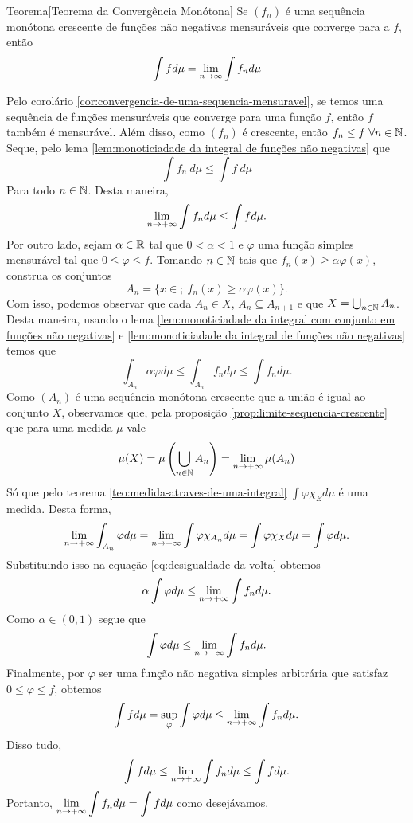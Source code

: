 \begin{env}{Teorema}[Teorema da Convergência Monótona]
	\label{teo:Convergencia Monótona}
	Se $(f_n)$ é uma sequência monótona crescente de funções não negativas mensuráveis que converge para a $f$, então
	$$
	\int f d\mu = \displaystyle \lim_{n \to \infty} \int f_n d\mu
	$$
\end{env}
\begin{prova}
	Pelo corolário \ref{cor:convergencia-de-uma-sequencia-mensuravel}, se temos uma sequência de funções mensuráveis que converge para uma função $f$, então $f$ também é mensurável.
	Além disso,
	como $(f_n)$ é crescente, então $f_n \leq f\ \forall n \in \operatorname{\mathbb{N}}$.
	Seque, pelo lema \ref{lem:monoticiadade da integral de funções não negativas} que 
	$$
	\int f_n\ d\mu \leq \int f\ d\mu
	$$
	Para todo $n \in \operatorname{\mathbb{N}}$.
	Desta maneira, 
	$$
	\displaystyle \lim_{n \to +\infty}\int f_n d\mu \leq \int f d\mu.
	$$
	Por outro lado, sejam $\alpha \in \mathbb{R}$ tal que $0 < \alpha <1$ e 
	$\varphi$ uma função simples mensurável tal que $0 \leq \varphi \leq f$.
	Tomando $n \in \operatorname{\mathbb{N}}$ tais que $f_n(x) \geq \alpha \varphi(x)$, construa
	os conjuntos 
	$$
	A_n =\{x \in ;\ f_n(x) \geq \alpha \varphi(x)\}.
	$$
	Com isso, podemos observar que cada $A_n \in X$, $A_{n} \subseteq A_{n+1}$
	e que $X = \bigcup_{n \in \operatorname{\mathbb{N}}}A_n$.
	Desta maneira, usando o lema \ref{lem:monoticiadade da integral com conjunto em funções não negativas} e \ref{lem:monoticiadade da integral de funções não negativas} temos que 
	\begin{equation}
		\label{eq:desigualdade da volta}
		\int_{A_n} \alpha\varphi d\mu
		\leq
		\int_{A_n} f_n d\mu
		\leq
		\int f_n d\mu.		
	\end{equation}
	Como $(A_n)$ é uma sequência monótona crescente que a união é igual ao conjunto $X$, observamos que, pela proposição \ref{prop:limite-sequencia-crescente} que para uma medida $\mu$ vale
	$$
	\mu(X) = \mu\left(\bigcup_{n \in \operatorname{\mathbb{N}}}A_n\right) = \lim_{n \to +\infty} \mu(A_n)
	$$
	Só que pelo teorema \ref{teo:medida-atraves-de-uma-integral} $\int \varphi \chi_E d\mu$ é uma medida.
	Desta forma, 
	$$
	\displaystyle \lim_{n \to +\infty} \int_{A_n} \varphi d\mu 
	= \displaystyle \lim_{n \to +\infty} \int \varphi \chi_{A_n} d\mu
	= \int \varphi \chi_X d\mu
	= \int \varphi d\mu.
	$$
	Substituindo isso na equação \ref{eq:desigualdade da volta} obtemos
	$$
	\alpha \int \varphi d\mu \leq \displaystyle \lim_{n \to +\infty} \int f_n d\mu.
	$$
	Como $\alpha \in (0,1)$ segue que
	$$
	\int \varphi d\mu \leq \displaystyle \lim_{n \to +\infty} \int f_n d\mu.
	$$
	Finalmente, por $\varphi$ ser uma função não negativa simples arbitrária que satisfaz $0\leq \varphi \leq f$, obtemos
	$$
	\int f d\mu 
	= \sup_{\varphi} \int \varphi d\mu \leq \displaystyle \lim_{n \to +\infty}\int f_n d\mu.
	$$
	Disso tudo,
	$$
	\int f d\mu 
	\leq 
	\displaystyle \lim_{n \to +\infty}\int f_n d\mu
	\leq
	\int f d\mu.
	$$
	Portanto,  $\displaystyle \displaystyle \lim_{n \to +\infty}\int f_n d\mu
	=
	\int f d\mu$ como desejávamos.
\end{prova}

